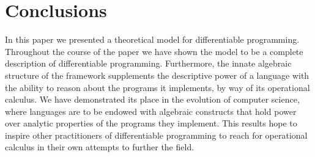 \section{Conclusions}

In this paper we presented a theoretical model for differentiable programming.
Throughout the course of the paper we have shown the model to be a complete description of differentiable programming.
Furthermore, the innate algebraic structure of the framework supplements the descriptive power of a language with the ability to reason about the programs it implements, by way of its operational calculus.
We have demonstrated its place in the evolution of computer science, where languages are to be endowed with algebraic constructs that hold power over analytic properties of the programs they implement.
This results hope to inspire other practitioners of differentiable programming to reach for operational calculus in their own attempts to further the field. 
